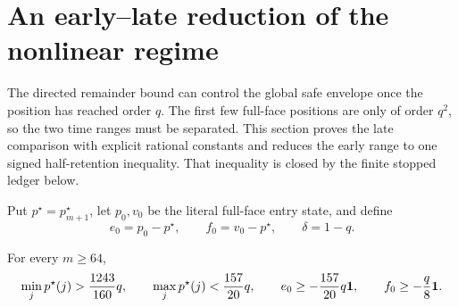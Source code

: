 \section{An early--late reduction of the nonlinear regime}
\label{sec:terminal-modal-regime-reduction}

The directed remainder bound can control the global safe envelope once the
position has reached order $q$.  The first few full-face positions are only
of order $q^2$, so the two time ranges must be separated.  This section
proves the late comparison with explicit rational constants and reduces the
early range to one signed half-retention inequality.  That inequality is
closed by the finite stopped ledger below.

Put $p^\star=p_{m+1}^\star$, let $p_0,v_0$ be the literal full-face entry
state, and define
\begin{equation}
 e_0=p_0-p^\star,\qquad f_0=v_0-p^\star,\qquad \delta=1-q.
 \label{eq:terminal-modal-entry-position-errors}
\end{equation}

\begin{lemma}
\label{lem:terminal-modal-entry-position-bounds}
For every $m\ge64$,
\begin{equation}
 \min_jp^\star(j)>\frac{1243}{160}q,
 \qquad
 \max_jp^\star(j)<\frac{157}{20}q,
 \qquad
 e_0\ge-\frac{157}{20}q\mathbf{1},
 \qquad
 f_0\ge-\frac q8\mathbf{1}.
 \label{eq:terminal-modal-entry-position-bounds}
\end{equation}
\end{lemma}

